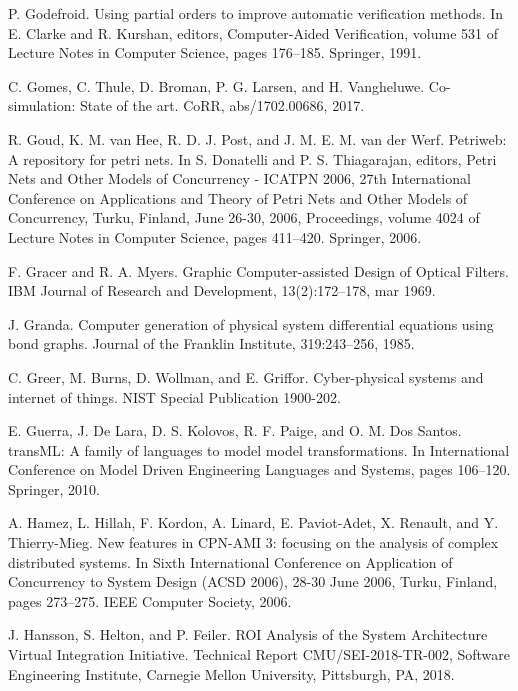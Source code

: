 \begin{description}[style=nextline,leftmargin=12mm,labelwidth=10mm,font=\normalfont]
\item[{[125]}] P. Godefroid. Using partial orders to improve automatic verification methods. In E. Clarke and R. Kurshan, editors, Computer-Aided Verification, volume 531 of Lecture Notes in Computer Science, pages 176–185. Springer, 1991.

\item[{[126]}] C. Gomes, C. Thule, D. Broman, P. G. Larsen, and H. Vangheluwe. Co-simulation: State of the art. CoRR, abs/1702.00686, 2017.

\item[{[127]}] R. Goud, K. M. van Hee, R. D. J. Post, and J. M. E. M. van der Werf. Petriweb: A repository for petri nets. In S. Donatelli and P. S. Thiagarajan, editors, Petri Nets and Other Models of Concurrency - ICATPN 2006, 27th International Conference on Applications and Theory of Petri Nets and Other Models of Concurrency, Turku, Finland, June 26-30, 2006, Proceedings, volume 4024 of Lecture Notes in Computer Science, pages 411–420. Springer, 2006.

\item[{[128]}] F. Gracer and R. A. Myers. Graphic Computer-assisted Design of Optical Filters. IBM Journal of Research and Development, 13(2):172–178, mar 1969.

\item[{[129]}] J. Granda. Computer generation of physical system differential equations using bond graphs. Journal of the Franklin Institute, 319:243–256, 1985.

\item[{[130]}] C. Greer, M. Burns, D. Wollman, and E. Griffor. Cyber-physical systems and internet of things. NIST Special Publication 1900-202.

\item[{[131]}] E. Guerra, J. De Lara, D. S. Kolovos, R. F. Paige, and O. M. Dos Santos. transML: A family of languages to model model transformations. In International Conference on Model Driven Engineering Languages and Systems, pages 106–120. Springer, 2010.

\item[{[132]}] A. Hamez, L. Hillah, F. Kordon, A. Linard, E. Paviot-Adet, X. Renault, and Y. Thierry-Mieg. New features in CPN-AMI 3: focusing on the analysis of complex distributed systems. In Sixth International Conference on Application of Concurrency to System Design (ACSD 2006), 28-30 June 2006, Turku, Finland, pages 273–275. IEEE Computer Society, 2006.

\item[{[133]}] J. Hansson, S. Helton, and P. Feiler. ROI Analysis of the System Architecture Virtual Integration Initiative. Technical Report CMU/SEI-2018-TR-002, Software Engineering Institute, Carnegie Mellon University, Pittsburgh, PA, 2018.


\end{description}

